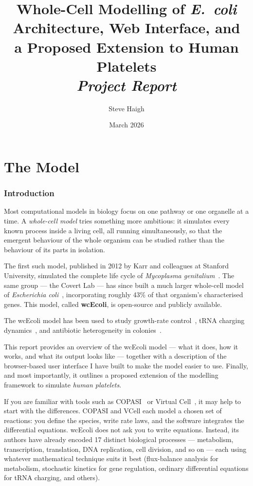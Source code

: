 \documentclass[11pt,a4paper]{article}
\title{%
  \Large Whole-Cell Modelling of \textit{E.~coli} \\[4pt]
  \large Architecture, Web Interface, and \\
         a Proposed Extension to Human Platelets \\[10pt]
  \normalsize \textit{Project Report}
}
\author{Steve Haigh}
\date{March 2026}
\begin{document}
\maketitle
\thispagestyle{empty}
\tableofcontents
\newpage


\part{The Model}

\section{Introduction}

Most computational models in biology focus on one pathway or one organelle at
a time.  A \emph{whole-cell model} tries something more ambitious: it
simulates every known process inside a living cell, all running
simultaneously, so that the emergent behaviour of the whole organism can be
studied rather than the behaviour of its parts in isolation.

The first such model, published in 2012 by Karr and colleagues at Stanford
University, simulated the complete life cycle of \textit{Mycoplasma
genitalium}~\cite{Karr2012}.  The same group --- the Covert Lab --- has since
built a much larger whole-cell model of \textit{Escherichia
coli}~\cite{Sun2021, AhnHorst2022}, incorporating roughly 43\% of that
organism's characterised genes.  This model, called \textbf{wcEcoli}, is
open-source and publicly available.

The wcEcoli model has been used to study growth-rate
control~\cite{AhnHorst2022}, tRNA charging dynamics~\cite{Choi2023}, and
antibiotic heterogeneity in colonies~\cite{Skalnik2023}.

This report provides an overview of the wcEcoli model --- what it does, how it
works, and what its output looks like --- together with a description of the
browser-based user interface I have built to make the model easier to use.
Finally, and most importantly, it outlines a proposed extension of the
modelling framework to simulate \emph{human platelets}.

If you are familiar with tools such as COPASI~\cite{Hoops2006} or Virtual
Cell~\cite{Moraru2008}, it may help to start with the differences.  COPASI
and VCell each model a chosen set of reactions: you define the species, write
rate laws, and the software integrates the differential equations.  wcEcoli
does not ask you to write equations.  Instead, its authors have already
encoded 17 distinct biological processes --- metabolism, transcription,
translation, DNA replication, cell division, and so on --- each using whatever
mathematical technique suits it best (flux-balance analysis for metabolism,
stochastic kinetics for gene regulation, ordinary differential equations for
tRNA charging, and others).
\end{document}
